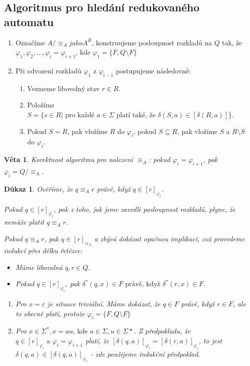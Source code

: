 \documentclass[10pt, a4paper, titlepage]{article}
\theoremstyle{note}
\newtheorem{veta}{\textbf{Věta}}
\newtheorem{dukaz}{\textbf{Důkaz}}
\begin{document}
\subsection{Algoritmus pro hled\'an\'i redukovan\'eho automatu}

\begin{enumerate}
\item
Označ\'ime $A/ \equiv_{A} jako A^{R}$, konstruujeme posloupnost rozkladů na $Q$ tak, že $\varphi_{1}, \varphi_{2}, \ldots, \varphi_{i} = \varphi_{i+1}$,
kde $\varphi_{1} = \lbrace F, Q \setminus F \rbrace$

\item
Při odvozen\'i rozkladů $\varphi_{1}$ z $\varphi_{i-1}$ postupujeme n\'asledovně:
\begin{enumerate}
\item
Vezmeme libovoln\'y stav $r \in R$.

\item
Polož\'ime $S = \lbrace s \in R | \text{ pro každ\'e } a \in \Sigma \text{ plat\'i tak\'e, že }\delta(S, a) \in [\delta(R, a)] \rbrace$.

\item
Pokud $S = R$, pak vlož\'ime $R$ do $\varphi_{i}$, pokud $S \subseteq R$, pak vlož\'ime $S$ a $R \setminus S$ do $\varphi_{i}$.
\end{enumerate}
\end{enumerate}

\begin{veta}
Korektnost algoritmu pro nalezen\'i $\equiv_{A}$: pokud $\varphi_{i} = \varphi_{i+1}$, pak $\varphi_{i} = Q/ \equiv_{A}$.
\end{veta}

\begin{dukaz}
Ověříme, že $q \equiv_{A} r$ právě, když $q \in [r]_{\varphi_{i}}$.

Pokud $q \in [r]_{\varphi_{i}}$, pak z toho, jak jsme zavedli
posloupnost rozkladů, plyne, že nemůže platit $q \equiv_{A} r$.

Pokud $q \equiv_{A} r$, pak $q \in [r]_{\equiv_{A}}$ a zbývá dokázat opačnou implikaci, což provedeme indukcí přes délku řetězce:
\begin{itemize}
\item
Máme libovolná $q, r \in Q$.

\item Pokud $q \in [r]_{\varphi_{i}}$, pak $\delta^{*}(q,x) \in F \text{ právě, když } \delta^{*}(r, x) \in F$.
\end{itemize}
\begin{enumerate}
\item
Pro $x = \varepsilon$ je situace triviální.
Máme dokázat, že $q \in F$ právě, když $r \in F$, ale to obecně platí, protože $\varphi_{i} = \lbrace F, Q \setminus F \rbrace$
\item
Pro $x \in \Sigma^{*}, x = au \text{, kde } a \in \Sigma, u \in \Sigma{*}$.
Z předpokladu, že $q \in [r]_{\varphi_{i}} \text{ a } \varphi_{i} =\varphi_{i+1}$ platí, že $[\delta(q, a)]_{\varphi_{i}} = [\delta(r, a)]_{\varphi_{i}}$,
to jest $\delta(q, a) \in [\delta(q, a)]_{\varphi_{i}}$ - zde použijeme indukční předpoklad.
\end{enumerate}
\end{dukaz}




\renewcommand{\indexcolumns}{3}
\printindex
\end{document}
